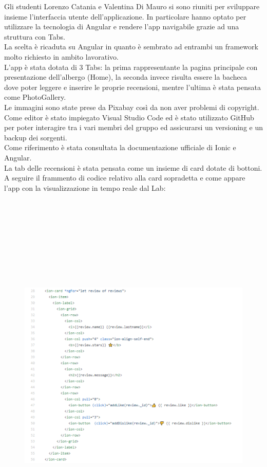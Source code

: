 \documentclass{article}[12pt]
\begin{document}
{Gli studenti Lorenzo Catania e Valentina Di Mauro si sono riuniti per sviluppare insieme l'interfaccia utente dell'applicazione. In particolare hanno optato per utilizzare la tecnologia di Angular e rendere l'app navigabile grazie ad una struttura con Tabs.\\ La scelta è ricaduta su Angular in quanto è sembrato ad entrambi un framework molto richiesto in ambito lavorativo. \\
L'app è stata dotata di 3 Tabs: la prima rappresentante la pagina principale con presentazione dell'albergo (Home), la seconda invece risulta essere la bacheca dove poter leggere e inserire le proprie recensioni, mentre l'ultima è stata pensata come PhotoGallery.\\ Le immagini sono state prese da Pixabay così da non aver problemi di copyright. 
Come editor è stato impiegato Visual Studio Code ed è stato utilizzato GitHub per poter interagire tra i vari membri del gruppo ed assicurarsi un versioning e un backup dei sorgenti.\\ 
Come riferimento è stata consultata la documentazione ufficiale di Ionic e Angular.\\ La tab delle recensioni è stata pensata come un insieme di card dotate di bottoni. 
A seguire il frammento di codice relativo alla card sopradetta e come appare l'app con la visualizzazione in tempo reale dal Lab:\\
\begin{figure}
	\includegraphics[height=18cm, width=\columnwidth]{img/codicecard.png}
\end{figure}

}
\end{document}
